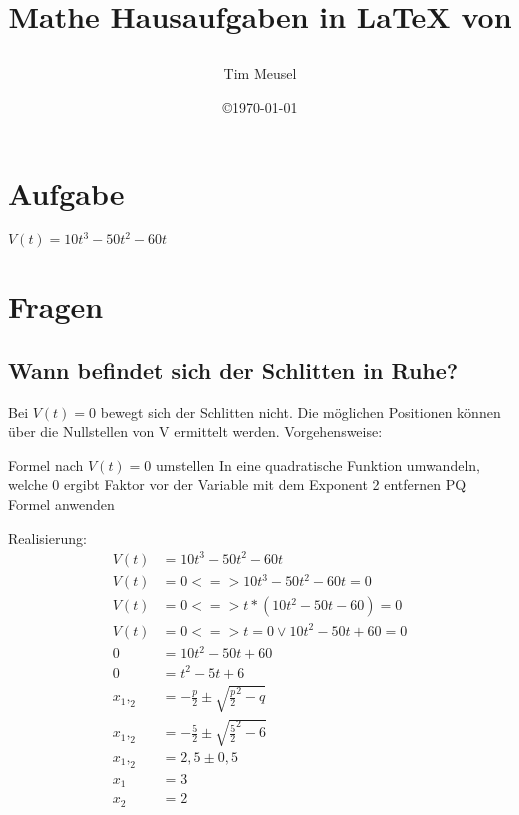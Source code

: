 \documentclass[a4paper,11pt]{scrartcl}
\author{Tim Meusel}
\title{Mathe Hausaufgaben in \LaTeX{} von \author{}}
\date{\copyright\today}
\begin{document}
\maketitle

\section{Aufgabe}

$V(t) = 10t^3 - 50t^2 - 60t$

\section{Fragen}

\subsection{Wann befindet sich der Schlitten in Ruhe?}
Bei $V(t) = 0$ bewegt sich der Schlitten nicht. Die möglichen Positionen können
über die Nullstellen von V ermittelt werden. Vorgehensweise:

\begin{outline}
  \1 Formel nach $V(t) = 0$ umstellen
  \1 In eine quadratische Funktion umwandeln, welche 0 ergibt
  \1 Faktor vor der Variable mit dem Exponent 2 entfernen
  \1 PQ Formel anwenden
\end{outline}

Realisierung:
\begin{align*}
  V(t) &= 10t^3 - 50t^2 - 60t                         \\
  V(t) &= 0 <=> 10t^3 - 50t^2 - 60t = 0               \\
  V(t) &= 0 <=> t * (10t^2 - 50t - 60) = 0            \\
  V(t) &= 0 <=> t = 0 \vee 10t^2 - 50t + 60 = 0       \\
     0 &= 10t^2 - 50t + 60                            \\
     0 &= t^2 - 5t + 6                                \\
 x_1,_2 &= -\frac{p}{2} \pm \sqrt{\frac{p}{2}^2 - q}  \\
 x_1,_2 &= -\frac{5}{2} \pm \sqrt{\frac{5}{2}^2 - 6}  \\
 x_1,_2 &= 2,5 \pm 0,5                                \\
 x_1    &= 3                                          \\
 x_2    &= 2                                          \\
\end{align*}
\end{document}
